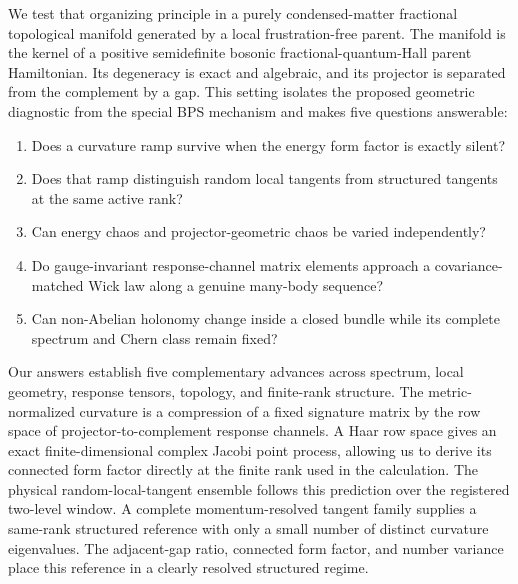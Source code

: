 We test that organizing principle in a purely condensed-matter fractional
topological manifold generated by a local frustration-free parent.
The manifold is the kernel of a positive semidefinite bosonic
fractional-quantum-Hall parent Hamiltonian.
Its degeneracy is exact and algebraic, and its projector is separated from the
complement by a gap.
This setting isolates the proposed geometric diagnostic from the special BPS
mechanism and makes five questions answerable:

\begin{enumerate}
 \item Does a curvature ramp survive when the energy form factor is exactly
 silent?
 \item Does that ramp distinguish random local tangents from structured
 tangents at the same active rank?
 \item Can energy chaos and projector-geometric chaos be varied independently?
 \item Do gauge-invariant response-channel matrix elements approach a
 covariance-matched Wick law along a genuine many-body sequence?
 \item Can non-Abelian holonomy change inside a closed bundle while its
 complete spectrum and Chern class remain fixed?
\end{enumerate}

Our answers establish five complementary advances across spectrum, local
geometry, response tensors, topology, and finite-rank structure.
The metric-normalized curvature is a compression of a fixed signature matrix
by the row space of projector-to-complement response channels.
A Haar row space gives an exact finite-dimensional complex Jacobi point
process, allowing us to derive its connected form factor directly at the
finite rank used in the calculation.
The physical random-local-tangent ensemble follows this prediction over the
registered two-level window.
A complete momentum-resolved tangent family supplies a same-rank structured
reference with only a small number of distinct curvature eigenvalues.  The
adjacent-gap ratio, connected form factor, and number variance place this
reference in a clearly resolved structured regime.

